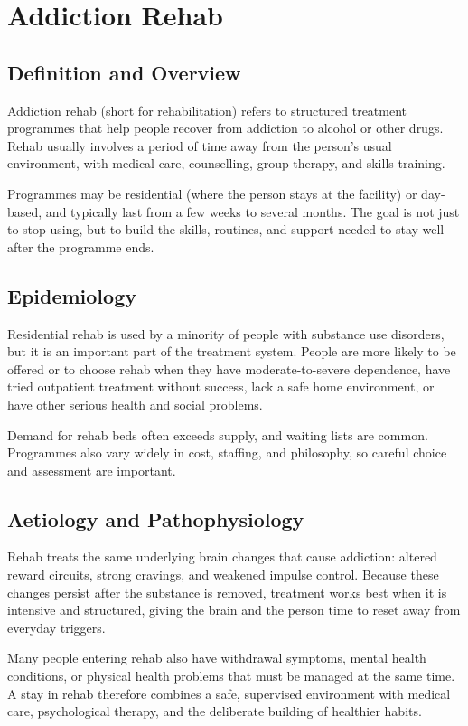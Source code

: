 \chapter{Addiction Rehab}

\section*{Definition and Overview}
Addiction rehab (short for rehabilitation) refers to structured treatment programmes that help people recover from addiction to alcohol or other drugs. Rehab usually involves a period of time away from the person's usual environment, with medical care, counselling, group therapy, and skills training.

Programmes may be residential (where the person stays at the facility) or day-based, and typically last from a few weeks to several months. The goal is not just to stop using, but to build the skills, routines, and support needed to stay well after the programme ends.

\section*{Epidemiology}
Residential rehab is used by a minority of people with substance use disorders, but it is an important part of the treatment system. People are more likely to be offered or to choose rehab when they have moderate-to-severe dependence, have tried outpatient treatment without success, lack a safe home environment, or have other serious health and social problems.

Demand for rehab beds often exceeds supply, and waiting lists are common. Programmes also vary widely in cost, staffing, and philosophy, so careful choice and assessment are important.

\section*{Aetiology and Pathophysiology}
Rehab treats the same underlying brain changes that cause addiction: altered reward circuits, strong cravings, and weakened impulse control. Because these changes persist after the substance is removed, treatment works best when it is intensive and structured, giving the brain and the person time to reset away from everyday triggers.

Many people entering rehab also have withdrawal symptoms, mental health conditions, or physical health problems that must be managed at the same time. A stay in rehab therefore combines a safe, supervised environment with medical care, psychological therapy, and the deliberate building of healthier habits.

